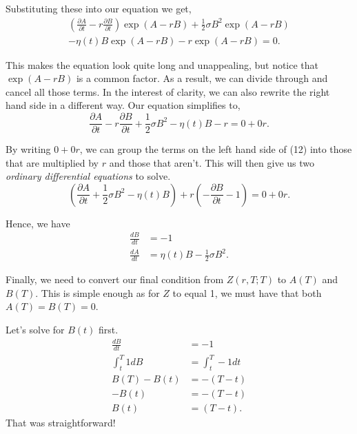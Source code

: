 \documentclass[11pt]{article}
\begin{document}
Substituting these into our equation we get,
\begin{multline}
    \left( \frac{\partial A}{\partial t} - r \frac{\partial B}{\partial t} \right) \exp ( A - rB) + \frac{1}{2} \sigma B^2 \exp (A-rB) \\ - \eta(t) B \exp (A - rB) - r \exp (A - rB) = 0.
\end{multline}

This makes the equation look quite long and unappealing, but notice that $\exp (A - rB)$ is a common factor. As a result, we can divide through and cancel all those terms. In the interest of clarity, we can also rewrite the right hand side in a different way. Our equation simplifies to,
\begin{equation}
    \frac{\partial A}{\partial t} - r \frac{\partial B}{\partial t}  + \frac{1}{2} \sigma B^2 - \eta(t) B - r = 0 + 0r.
\end{equation}

By writing $0 + 0r$, we can group the terms on the left hand side of (12) into those that are multiplied by $r$ and those that aren't. This will then give us two \textit{ordinary differential equations} to solve.
\begin{equation}
    \left( \frac{\partial A}{\partial t} + \frac{1}{2} \sigma B^2 - \eta(t) B \right) + r \left( -\frac{\partial B}{\partial t} - 1 \right) = 0 + 0r. 
\end{equation}

Hence, we have
\begin{align}
    \frac{dB}{dt} &= - 1 \\
    \frac{dA}{dt} &= \eta(t) B - \frac{1}{2} \sigma B^2.
\end{align}

Finally, we need to convert our final condition from $Z(r,T;T)$ to $A(T)$ and $B(T)$. This is simple enough as for $Z$ to equal 1, we must have that both $A(T) = B(T) = 0$.

Let's solve for $B(t)$ first.
\begin{align}
\frac{dB}{dt} &= - 1 \\[10pt]
\int_{t}^{T} 1 dB &= \int_{t}^{T} -1 dt \\[10pt]
B(T) - B(t) &= -(T-t) \\[10pt]
-B(t) &= -(T-t) \\[10pt]
B(t) &= (T-t).
\end{align}
That was straightforward!

\newpage
\end{document}
